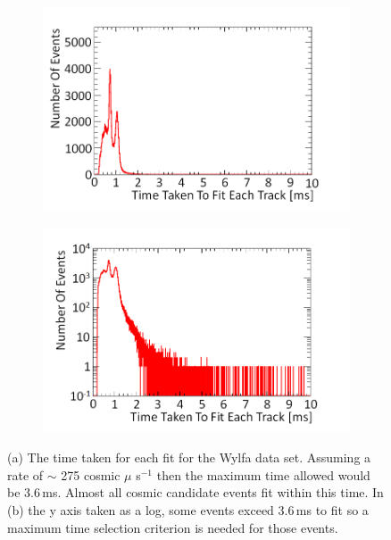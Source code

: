 \begin{figure}[!h]
\centering
\begin{subfigure}{.5\textwidth}
  \centering
  \includegraphics[width=\linewidth]{Chapter6/Figs/Raster/wylfaTrackerTimeMedText.png}
  \captionsetup{width=.9\linewidth}
  \caption{}
  \label{subFig:wylfaTrackerTime}
\end{subfigure}%
\begin{subfigure}{.5\textwidth}
  \centering
\includegraphics[width=\linewidth]{Chapter6/Figs/Raster/wylfaTrackerTimeLogMedText.png}
  \captionsetup{width=.9\linewidth}
  \caption{}
  \label{subFig:wylfaTrackerTimeLog}
\end{subfigure}
\caption{(a) The time taken for each fit for the Wylfa data set. Assuming a rate of $\sim$ 275 cosmic $\mu$ s$^{-1}$ then the maximum time allowed would be 3.6\,ms. Almost all cosmic candidate events fit within this time. In (b) the y axis taken as a log, some events exceed 3.6\,ms to fit so a maximum time selection criterion is needed for those events.}
\label{fig:wylfaTrackerTimeAndLog}
\end{figure}

